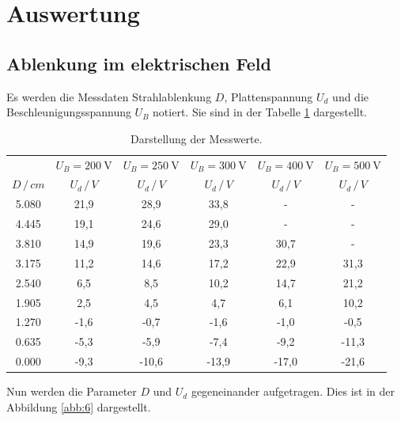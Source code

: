 \section{Auswertung}
\subsection{Ablenkung im elektrischen Feld}
Es werden die Messdaten Strahlablenkung $D$, Plattenspannung $U_d$ und die Beschleunigungsspannung $U_B$ notiert.
Sie sind in der Tabelle \ref{tab:1} dargestellt.
\begin{table}[H]
  \centering
  \caption{Darstellung der Messwerte.}
  \label{tab:1}
  \begin{tabular}{c c c c c c}
\toprule
& \multicolumn{1}{c}{$U_B=\SI{200}{\volt}$} & \multicolumn{1}{c}{$U_B=\SI{250}{\volt}$} &\multicolumn{1}{c}{$U_B=\SI{300}{\volt}$}&\multicolumn{1}{c}{$U_B=\SI{400}{\volt}$}&\multicolumn{1}{c}{$U_B=\SI{500}{\volt}$}\\
\cmidrule(lr){2-2}\cmidrule(lr){3-3}\cmidrule(lr){4-4}\cmidrule(lr){5-5}\cmidrule(lr){6-6}
$D \, / \, cm$ & $U_d \, / \, V$ & $U_d \, / \, V$ & $U_d \, / \, V$ &$U_d \, / \, V$ & $U_d \, / \, V$\\
\midrule
5.080 & 21,9  & 28,9  & 33,8  & -    & -   \\
4.445 & 19,1  & 24,6  & 29,0  & -    & -   \\
3.810 & 14,9  & 19,6  & 23,3  & 30,7 & -   \\
3.175 & 11,2  & 14,6  & 17,2  & 22,9 & 31,3\\
2.540 &  6,5  &  8,5  & 10,2  & 14,7 & 21,2\\
1.905 &  2,5  &  4,5  &  4,7  &  6,1 & 10,2\\
1.270 & -1,6  & -0,7  & -1,6  & -1,0 & -0,5\\
0.635 & -5,3  & -5,9  & -7,4  & -9,2 &-11,3\\
0.000 & -9,3  &-10,6  &-13,9  &-17,0 &-21,6\\
\bottomrule
  \end{tabular}
\end{table}
Nun werden die Parameter $D$ und $U_d$ gegeneinander aufgetragen.
Dies ist in der Abbildung \ref{abb:6} dargestellt.
